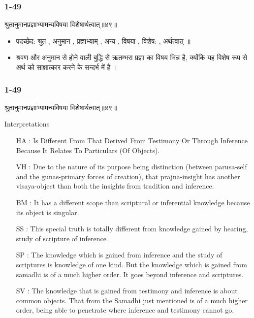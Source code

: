 \begin{frame}[fragile]\frametitle{ 1-49}
\begin{sanskrit}
श्रुतानुमानप्रज्ञाभ्यामन्यविषया विशेषार्थत्वात्॥४९॥
\end{sanskrit}

\begin{itemize}
\item पदच्छेद: श्रुत , अनुमान , प्रज्ञाभ्याम् , अन्य , विषया , विशेष: , अर्थत्वात् ॥
\item श्रवण और अनुमान से होने वाली बुद्धि से ऋतम्भरा प्रज्ञा का विषय भिन्न है, क्योंकि यह विशेष रूप से अर्थ को साक्षात्कार करने के सन्दर्भ में है ।
\end{itemize}
	
\end{frame}

\begin{frame}[fragile]\frametitle{ 1-49}
\begin{sanskrit}
श्रुतानुमानप्रज्ञाभ्यामन्यविषया विशेषार्थत्वात्॥४९॥
\end{sanskrit}

Interpretations
\begin{itemize}
\item [HA]: Is Different From That Derived From Testimony Or Through Inference Because It Relates To Particulars (Of Objects).
\item [VH]: Due to the nature of its purpose being distinction (between parusa-self and the gunas-primary forces of creation), that prajna-insight has another visaya-object than both the insights from tradition and inference.
\item [BM]: It has a different scope than scriptural or inferential knowledge because its object is singular.
\item [SS]: This special truth is totally different from knowledge gained by hearing, study of scripture of inference.
\item [SP]: The knowledge which is gained from inference and the study of scriptures is knowledge of one kind. But the knowledge which is gained from samadhi is of a much higher order. It goes beyond inference and scriptures.
\item [SV]: The knowledge that is gained from testimony and inference is about common objects. That from the Samadhi just mentioned is of a much higher order, being able to penetrate where inference and testimony cannot go. 
\end{itemize}
	
\end{frame}

